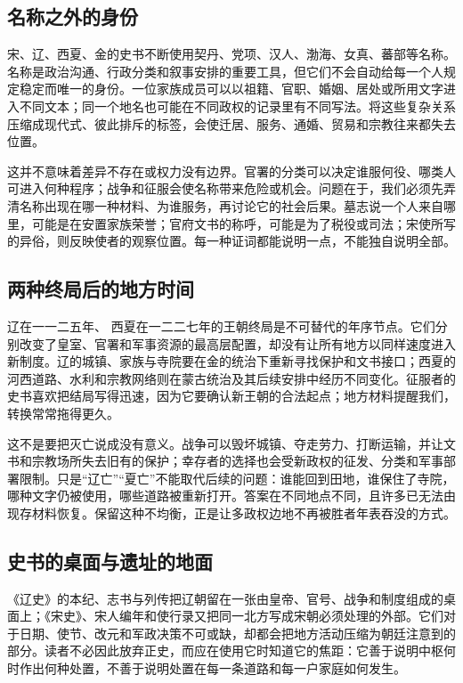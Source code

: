 \subsection{名称之外的身份}

宋、辽、西夏、金的史书不断使用契丹、党项、汉人、渤海、女真、蕃部等名称。名称是政治沟通、行政分类和叙事安排的重要工具，但它们不会自动给每一个人规定稳定而唯一的身份。一位家族成员可以以祖籍、官职、婚姻、居处或所用文字进入不同文本；同一个地名也可能在不同政权的记录里有不同写法。将这些复杂关系压缩成现代式、彼此排斥的标签，会使迁居、服务、通婚、贸易和宗教往来都失去位置。

这并不意味着差异不存在或权力没有边界。官署的分类可以决定谁服何役、哪类人可进入何种程序；战争和征服会使名称带来危险或机会。问题在于，我们必须先弄清名称出现在哪一种材料、为谁服务，再讨论它的社会后果。墓志说一个人来自哪里，可能是在安置家族荣誉；官府文书的称呼，可能是为了税役或司法；宋使所写的异俗，则反映使者的观察位置。每一种证词都能说明一点，不能独自说明全部。

\subsection{两种终局后的地方时间}

辽在一一二五年、 西夏在一二二七年的王朝终局是不可替代的年序节点。它们分别改变了皇室、官署和军事资源的最高层配置，却没有让所有地方以同样速度进入新制度。辽的城镇、家族与寺院要在金的统治下重新寻找保护和文书接口；西夏的河西道路、水利和宗教网络则在蒙古统治及其后续安排中经历不同变化。征服者的史书喜欢把结局写得迅速，因为它要确认新王朝的合法起点；地方材料提醒我们，转换常常拖得更久。

这不是要把灭亡说成没有意义。战争可以毁坏城镇、夺走劳力、打断运输，并让文书和宗教场所失去旧有的保护；幸存者的选择也会受新政权的征发、分类和军事部署限制。只是“辽亡”“夏亡”不能取代后续的问题：谁能回到田地，谁保住了寺院，哪种文字仍被使用，哪些道路被重新打开。答案在不同地点不同，且许多已无法由现存材料恢复。保留这种不均衡，正是让多政权边地不再被胜者年表吞没的方式。

\subsection{史书的桌面与遗址的地面}

《辽史》的本纪、志书与列传把辽朝留在一张由皇帝、官号、战争和制度组成的桌面上；《宋史》、宋人编年和使行录又把同一北方写成宋朝必须处理的外部。它们对于日期、使节、改元和军政决策不可或缺，却都会把地方活动压缩为朝廷注意到的部分。读者不必因此放弃正史，而应在使用它时知道它的焦距：它善于说明中枢何时作出何种处置，不善于说明处置在每一条道路和每一户家庭如何发生。


